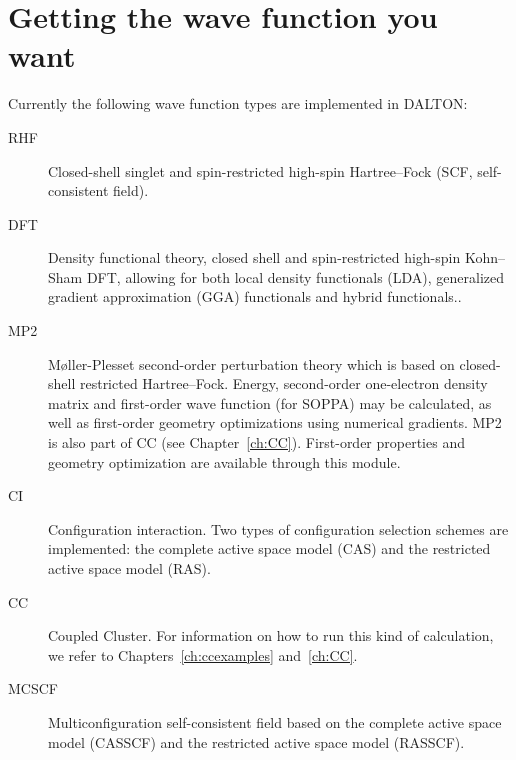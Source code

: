\chapter{\label{ch:wf-guide}Getting the wave function you want}

Currently the following wave function types are implemented in DALTON:

\begin{description}

\item[RHF] Closed-shell singlet and spin-restricted high-spin
Hartree--Fock (SCF, self-consistent
field).

\item[DFT] Density functional theory, closed shell and spin-restricted high-spin Kohn--Sham DFT, allowing for both local density functionals (LDA), generalized gradient approximation (GGA) functionals and hybrid functionals..

\item[MP2]
M{\o}ller-Plesset second-order perturbation theory which is based on
closed-shell restricted Hartree--Fock.  Energy, second-order one-electron
density matrix and first-order wave function (for SOPPA) may be
calculated, as well as first-order geometry optimizations using
numerical gradients. MP2 is also part of CC (see Chapter~\ref{ch:CC}).
First-order properties and geometry optimization are available through
this module.  

\item[CI] Configuration
interaction. Two types of
configuration selection schemes are implemented: the complete active
space model (CAS) and the restricted active space model (RAS).

\item[CC] Coupled Cluster.
For information on how to run this kind of calculation, we refer to 
Chapters~\ref{ch:ccexamples} and~\ref{ch:CC}.

\item[MCSCF] Multiconfiguration self-consistent field based on
the complete active space model (CASSCF) and
the restricted active space model
(RASSCF).

\end{description}

